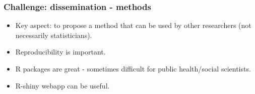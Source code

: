 \documentclass[slidestop,compress,serif,10pt]{beamer}
\begin{document}
\begin{frame}\frametitle{Challenge: dissemination - methods}

\begin{itemize}
\item Key aspect: to propose a method that can be used by other researchers (not necessarily statisticians).
\item Reproducibility is important.
\item R packages are great - sometimes difficult for public health/social scientists.
\item R-shiny webapp can be useful.
\end{itemize}

\begin{center}
\end{center}

\end{frame}
\end{document}
